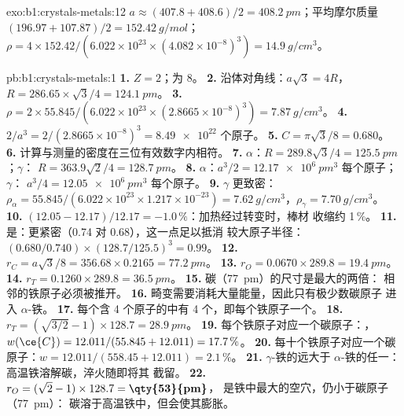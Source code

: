 \begin{solution}{exo:b1:crystals-metals:12}
$a \approx (407.8 + 408.6)/2 = \qty{408.2}{pm}$；平均摩尔质量 $(196.97 +
107.87)/2 = \qty{152.42}{g/mol}$；$\rho = 4 \times 152.42/(6.022 \times
10^{23} \times (4.082 \times 10^{-8})^3) = \qty{14.9}{g/cm^3}$。
\end{solution}

\begin{solution}{pb:b1:crystals-metals:1}
\textbf{1.} $Z = 2$；为 8。
\textbf{2.} 沿体对角线：$a\sqrt3 = 4R$，$R = 286.65 \times
\sqrt3/4 = \qty{124.1}{pm}$。
\textbf{3.} $\rho = 2 \times 55.845/(6.022 \times 10^{23} \times (2.8665
\times 10^{-8})^3) = \qty{7.87}{g/cm^3}$。
\textbf{4.} $2/a^3 = 2/(2.8665 \times 10^{-8})^3 = \num{8.49e22}$ 个原子。
\textbf{5.} $C = \pi\sqrt3/8 = 0.680$。
\textbf{6.} 计算与测量的密度在三位有效数字内相符。
\textbf{7.} $\alpha$：$R = 289.8\sqrt3/4 = \qty{125.5}{pm}$；$\gamma$：
$R = 363.9\sqrt2/4 = \qty{128.7}{pm}$。
\textbf{8.} $\alpha$：$a^3/2 = \qty{12.17e6}{pm^3}$ 每个原子；$\gamma$：
$a^3/4 = \qty{12.05e6}{pm^3}$ 每个原子。
\textbf{9.} $\gamma$ 更致密：$\rho_\alpha = 55.845/(6.022 \times 10^{23}
\times 1.217 \times 10^{-23}) = \qty{7.62}{g/cm^3}$，$\rho_\gamma =
\qty{7.70}{g/cm^3}$。
\textbf{10.} $(12.05 - 12.17)/12.17 = -1.0\,\%$：加热经过转变时，棒材
收缩约 1\,\%。
\textbf{11.} 是：更紧密（0.74 对 0.68），这一点足以抵消
较大原子半径：$(0.680/0.740) \times (128.7/125.5)^3 = 0.99$。
\textbf{12.} $r_C = a\sqrt3/8 = 356.68 \times 0.2165 = \qty{77.2}{pm}$。
\textbf{13.} $r_O = 0.0670 \times 289.8 = \qty{19.4}{pm}$。
\textbf{14.} $r_T = 0.1260 \times 289.8 = \qty{36.5}{pm}$。
\textbf{15.} 碳（\qty{77}{pm}）的尺寸是最大的两倍：
相邻的铁原子必须被推开。
\textbf{16.} 畸变需要消耗大量能量，因此只有极少数碳原子
进入 $\alpha$-铁。
\textbf{17.} 每个含 4 个原子的中有 4 个，即每个铁原子一个。
\textbf{18.} $r_T = (\sqrt{3/2} - 1) \times 128.7 = \qty{28.9}{pm}$。
\textbf{19.} 每个铁原子对应一个碳原子：，$w(\ce{C}) = 12.011/(55.845 +
12.011) = 17.7\,\%$。
\textbf{20.} 每十个铁原子对应一个碳原子：$w = 12.011/(558.45 + 12.011) =
2.1\,\%$。
\textbf{21.} $\gamma$-铁的远大于
$\alpha$-铁的任一：高温铁溶解碳，淬火随即将其
截留。
\textbf{22.} $r_O = (\sqrt2 - 1) \times 128.7 = \textbf{\qty{53}{pm}}$，
是铁中最大的空穴，仍小于碳原子（\qty{77}{pm}）：
碳溶于高温铁中，但会使其膨胀。
\end{solution}

